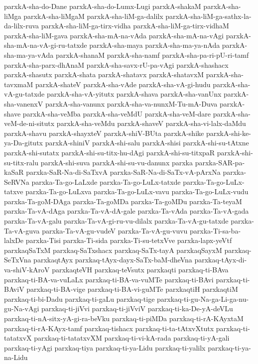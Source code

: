{parxkA-sha-do-Dane
parxkA-sha-do-Lumx-Lugi
parxkA-shakaM
parxkA-sha-liMga
parxkA-sha-liMgaM
parxkA-sha-liM-ga-dalilx
parxkA-sha-liM-ga-sathx-la-da-lilx-ruva
parxkA-sha-liM-ga-tirx-vidha
parxkA-sha-liM-ga-tirx-vidhaM
parxkA-sha-liM-gava
parxkA-sha-mA-na-vAda
parxkA-sha-mA-na-vAgi
parxkA-sha-mA-na-vA-gi-ru-tatxde
parxkA-sha-maya
parxkA-sha-ma-ya-nAda
parxkA-sha-ma-ya-vAda
parxkA-shanaM
parxkA-sha-namf
parxkA-sha-pa-ri-pU-ri-tamf
parxkA-sha-parx-dhAnaM
parxkA-sha-savx-rU-pa-vAgi
parxkA-shashacx
parxkA-shasutx
parxkA-shata
parxkA-shatavx
parxkA-shatavxM
parxkA-sha-tavxmaM
parxkA-shateV
parxkA-sha-vAde
parxkA-sha-vA-gi-hudu
parxkA-sha-vA-gu-tatxde
parxkA-sha-vA-yitutx
parxkA-shava
parxkA-sha-vanUnx
parxkA-sha-vanenxV
parxkA-sha-vanunx
parxkA-sha-va-nunxM-Tu-mA-Duva
parxkA-shave
parxkA-sha-veMba
parxkA-sha-veMdU
parxkA-sha-veM-dare
parxkA-sha-veM-de-ni-situtx
parxkA-sha-veMdu
parxkA-shaveV
parxkA-sha-vi-lalx-daMdu
parxkA-shavu
parxkA-shayxteV
parxkA-shiV-BUta
parxkA-shike
parxkA-shi-ke-ya-Da-gitutx
parxkA-shiniV
parxkA-shi-salu
parxkA-shisi
parxkA-shi-su-tAtxne
parxkA-shi-sutatx
parxkA-shi-su-titx-hu-dAgi
parxkA-shi-su-titxpaR
parxkA-shi-su-titx-ralu
parxkA-shi-suva
parxkA-shi-su-vu-danunx
parxka
parxka-SAR-pa-kaSaR
parxka-SaR-Na-di-SaTxvA
parxka-SaR-Na-di-SaTx-vA-pArxNa
parxka-SeRVNa
parxka-Ta-go-LaLxde
parxka-Ta-go-LuLx-tatxde
parxka-Ta-go-LuLx-tatxve
parxka-Ta-go-LuLxva
parxka-Ta-go-LuLx-vavu
parxka-Ta-go-LuLx-vudu
parxka-Ta-goM-DAga
parxka-Ta-goMDa
parxka-Ta-goMDu
parxka-Ta-teyaM
parxka-Ta-vA-dAga
parxka-Ta-vA-dA-gale
parxka-Ta-vAda
parxka-Ta-vA-gada
parxka-Ta-vA-galu
parxka-Ta-vA-gi-ru-vu-dilalx
parxka-Ta-vA-gu-tatxde
parxka-Ta-vA-guva
parxka-Ta-vA-gu-vudeV
parxka-Ta-vA-gu-vuvu
parxka-Ti-sa-ba-lalxDe
parxka-Tisi
parxka-Ti-sida
parxka-Ti-su-tetxVve
parxka-lapx-yeVtf
parxkaqSaTxM
parxkaq-SaTxshacx
parxkaq-SaTx-tayA
parxkaqSayxM
parxkaq-SeTxVna
parxkaqtAyx
parxkaq-tAyx-dayx-SaTx-baM-dheVna
parxkaq-tAyx-di-va-shiV-kAroV
parxkaqteVH
parxkaq-teVsutx
parxkaqti
parxkaq-ti-BAva
parxkaq-ti-BA-va-vuLaLx
parxkaq-ti-BA-va-vuMTe
parxkaq-ti-BAvi
parxkaq-ti-BAviV
parxkaq-ti-BA-vige
parxkaq-ti-BA-vi-guMTe
parxkaqtiH
parxkaqtiM
parxkaq-ti-bi-Dadu
parxkaq-ti-gaLu
parxkaq-tige
parxkaq-ti-gu-Na-ga-Li-ga-nu-gu-Na-vAgi
parxkaq-ti-jiVvi
parxkaq-ti-jiVviV
parxkaq-ti-ka-De-yA-deVLu
parxkaq-ti-nA-sitx-yA-gi-ra-beVku
parxkaq-ti-piMDa
parxkaq-ti-rA-KAyxtaM
parxkaq-ti-rA-KAyx-tamf
parxkaq-tishacx
parxkaq-ti-ta-tAtxvXtutx
parxkaq-ti-tatatxvX
parxkaq-ti-tatatxvXM
parxkaq-ti-vi-kA-rada
parxkaq-ti-yA-gali
parxkaq-ti-yAgi
parxkaq-tiya
parxkaq-ti-ya-Lidu
parxkaq-ti-yalilx
parxkaq-ti-ya-na-Lidu
}
